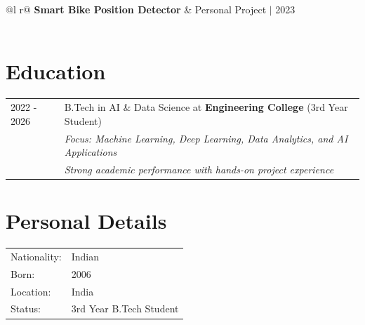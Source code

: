 \documentclass[a4paper,12pt]{article}
\begin{document}
\begin{tabularx}{\linewidth}{ @{}l r@{} }
\textbf{Smart Bike Position Detector} & \hfill Personal Project $|$ 2023 \\[2pt]
  \\
\end{tabularx}


\section{Education}
\begin{tabularx}{\linewidth}{@{}l X@{}}	
2022 - 2026 & B.Tech in AI \& Data Science at \textbf{Engineering College} \hfill \normalsize (3rd Year Student) \\
& \textit{Focus: Machine Learning, Deep Learning, Data Analytics, and AI Applications} \\
& \textit{Strong academic performance with hands-on project experience} \\
\end{tabularx}

\section{Personal Details}
\begin{tabularx}{\linewidth}{@{}l X@{}}
Nationality: & Indian \\
Born: & 2006 \\
Location: & India \\
Status: & 3rd Year B.Tech Student \\
\end{tabularx}

\end{document}
